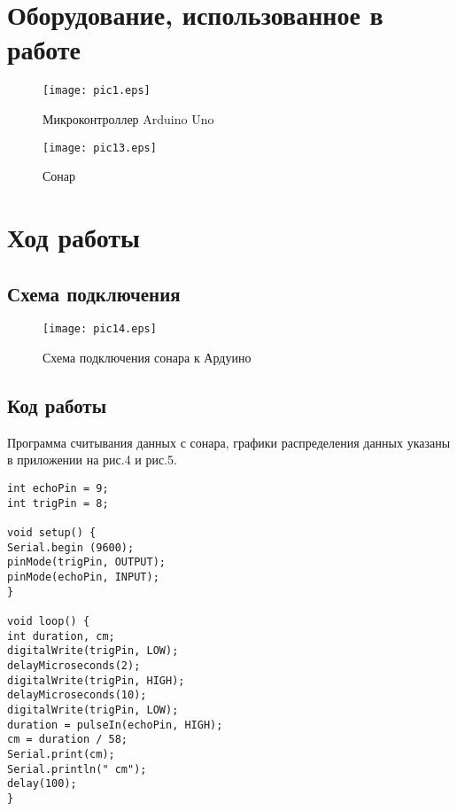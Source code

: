 \documentclass[12pt,a4paper]{scrartcl}
\begin{document}
 	\newpage
 
\section{Оборудование, использованное в работе}
\begin{figure}[h!]  
	\centering
	\texttt{[image: pic1.eps]} %
	\caption{Микроконтроллер Arduino Uno} 
	\label{image:pic1} %
\end{figure}	
\begin{figure}[h!]  
	\centering
	\texttt{[image: pic13.eps]} %
	\caption{Сонар} 
	\label{image:pic10} %
\end{figure}
  \newpage
  \section{Ход работы}
  \subsection{Схема подключения}
  
  \begin{figure}[h!]  
  	\centering
  	\texttt{[image: pic14.eps]} %
  	\caption{Схема подключения сонара к Ардуино} 
  	\label{image:pic11}
  \end{figure}

  \subsection{Код работы}
  Программа считывания данных с сонара, графики распределения данных указаны в приложении на рис.4 и рис.5.
 \begin{verbatim}
int echoPin = 9; 
int trigPin = 8; 

void setup() { 
Serial.begin (9600); 
pinMode(trigPin, OUTPUT); 
pinMode(echoPin, INPUT); 
} 

void loop() { 
int duration, cm; 
digitalWrite(trigPin, LOW); 
delayMicroseconds(2); 
digitalWrite(trigPin, HIGH); 
delayMicroseconds(10); 
digitalWrite(trigPin, LOW); 
duration = pulseIn(echoPin, HIGH); 
cm = duration / 58;
Serial.print(cm); 
Serial.println(" cm"); 
delay(100);
}
 \end{verbatim}
 
\end{document}
